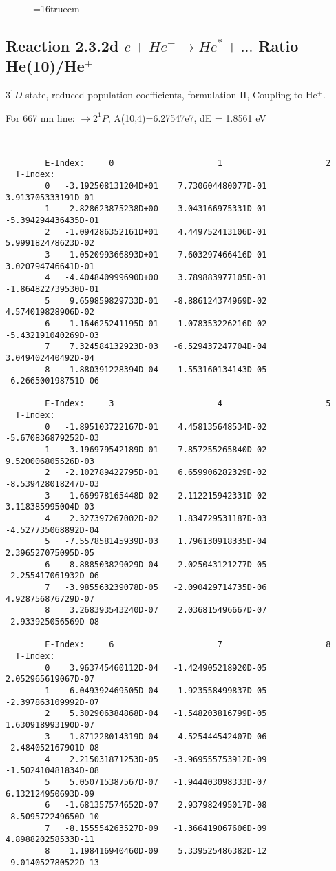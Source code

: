 \documentclass[12pt]{article}
\begin{document}
\begin{figure} \label{2.3.2c}
\epsfxsize=16truecm
\end{figure}
\newpage


\subsection{
  Reaction 2.3.2d $e + He^+ \rightarrow He^* + ... $ Ratio He(10)/He$^+$
}

  $3^1D$ state,
  reduced population coefficients, formulation II,
  Coupling to He$^+$.

  For 667 nm line: $\rightarrow 2^1P$, A(10,4)=6.27547e7, dE = 1.8561 eV

\begin{small}\begin{verbatim}


        E-Index:     0                     1                     2
  T-Index:
        0   -3.192508131204D+01    7.730604480077D-01    3.913705333191D-01
        1    2.828623875238D+00    3.043166975331D-01   -5.394294436435D-01
        2   -1.094286352161D+01    4.449752413106D-01    5.999182478623D-02
        3    1.052099366893D+01   -7.603297466416D-01    3.020794746641D-01
        4   -4.404840999690D+00    3.789883977105D-01   -1.864822739530D-01
        5    9.659859829733D-01   -8.886124374969D-02    4.574019828906D-02
        6   -1.164625241195D-01    1.078353226216D-02   -5.432191040269D-03
        7    7.324584132923D-03   -6.529437247704D-04    3.049402440492D-04
        8   -1.880391228394D-04    1.553160134143D-05   -6.266500198751D-06

        E-Index:     3                     4                     5
  T-Index:
        0   -1.895103722167D-01    4.458135648534D-02   -5.670836879252D-03
        1    3.196979542189D-01   -7.857255265840D-02    9.520006805526D-03
        2   -2.102789422795D-01    6.659906282329D-02   -8.539428018247D-03
        3    1.669978165448D-02   -2.112215942331D-02    3.118385995004D-03
        4    2.327397267002D-02    1.834729531187D-03   -4.527735068892D-04
        5   -7.557858145939D-03    1.796130918335D-04    2.396527075095D-05
        6    8.888503829029D-04   -2.025043121277D-05   -2.255417061932D-06
        7   -3.985563239078D-05   -2.090429714735D-06    4.928756876729D-07
        8    3.268393543240D-07    2.036815496667D-07   -2.933925056569D-08

        E-Index:     6                     7                     8
  T-Index:
        0    3.963745460112D-04   -1.424905218920D-05    2.052965619067D-07
        1   -6.049392469505D-04    1.923558499837D-05   -2.397863109992D-07
        2    5.302906384868D-04   -1.548203816799D-05    1.630918993190D-07
        3   -1.871228014319D-04    4.525444542407D-06   -2.484052167901D-08
        4    2.215031871253D-05   -3.969555753912D-09   -1.502410481834D-08
        5    5.050715387567D-07   -1.944403098333D-07    6.132124950693D-09
        6   -1.681357574652D-07    2.937982495017D-08   -8.509572249650D-10
        7   -8.155554263527D-09   -1.366419067606D-09    4.898820258533D-11
        8    1.198416940460D-09    5.339525486382D-12   -9.014052780522D-13


\end{verbatim}
\end{small}
\end{document}
